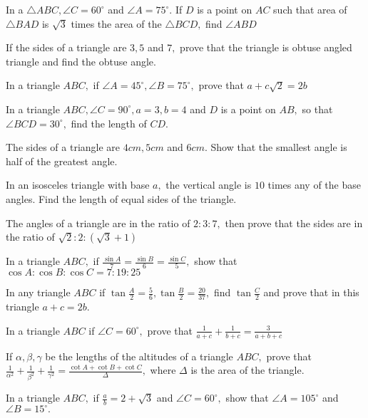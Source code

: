 \item In a $\triangle ABC, \angle C=60^\circ$ and $\angle A=75^\circ.$ If $D$ is a point on $AC$ such that
   area of $\triangle BAD$ is $\sqrt{3}$ times the area of the $\triangle BCD,$ find $\angle ABD$

\item If the sides of a triangle are $3, 5$ and $7,$ prove that the triangle is obtuse angled triangle and find the obtuse
   angle.

\item In a triangle $ABC,$ if $\angle A = 45^\circ, \angle B = 75^\circ,$ prove that $a + c\sqrt{2} = 2b$

\item In a triangle $ABC, \angle C = 90^\circ, a = 3, b =4$ and $D$ is a point on $AB,$ so that $\angle
    BCD=30^\circ,$ find the length of $CD.$

\item The sides of a triangle are $4cm, 5cm$ and $6cm.$ Show that the smallest angle is half of the greatest angle.

\item In an isosceles triangle with base $a,$ the vertical angle is $10$ times any of the base angles. Find the length of
    equal sides of the triangle.

\item The angles of a triangle are in the ratio of $2:3:7,$ then prove that the sides are in the ratio of
    $\sqrt{2}:2:(\sqrt{3} + 1)$

\item In a triangle $ABC,$ if $\frac{\sin A}{7} = \frac{\sin B}{6} = \frac{\sin C}{5},$ show that $\cos A:\cos
    B:\cos C = 7:19:25$

\item In any triangle $ABC$ if $\tan\frac{A}{2} = \frac{5}{6}, \tan\frac{B}{2} = \frac{20}{37},$ find
    $\tan\frac{C}{2}$ and prove that in this triangle $a + c = 2b.$

\item In a triangle $ABC$ if $\angle C=60^\circ,$ prove that $\frac{1}{a + c} + \frac{1}{b + c} = \frac{3}{a + b +
    c}$

\item If $\alpha, \beta, \gamma$ be the lengths of the altitudes of a triangle $ABC,$ prove that
    $\frac{1}{\alpha^2} + \frac{1}{\beta^2} + \frac{1}{\gamma^2} = \frac{\cot A + \cot B + \cot C}{\Delta},$ where
    $\Delta$ is the area of the triangle.

\item In a triangle $ABC,$ if $\frac{a}{b} = 2 + \sqrt{3}$ and $\angle C= 60^\circ,$ show that $\angle A =
    105^\circ$ and $\angle B=15^\circ.$

